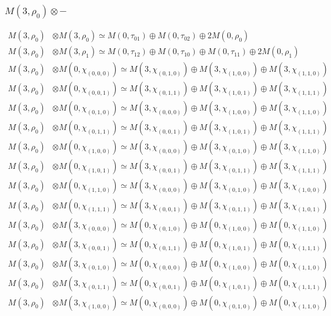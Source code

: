 \subsubsection{$ M(3,\rho_{0})\otimes -$}
\begin{align*}
M(3,\rho_{0}) &\otimes M(3,\rho_{0}) \simeq M(0,\tau_{01}) \oplus M(0,\tau_{02}) \oplus 2 M(0,\rho_{0}) \\
M(3,\rho_{0}) &\otimes M(3,\rho_{1}) \simeq M(0,\tau_{12}) \oplus M(0,\tau_{10}) \oplus M(0,\tau_{11}) \oplus 2 M(0,\rho_{1}) \\
M(3,\rho_{0}) &\otimes M(0,\chi_{(0,0,0)}) \simeq M(3,\chi_{(0,1,0)}) \oplus M(3,\chi_{(1,0,0)}) \oplus M(3,\chi_{(1,1,0)}) \\
M(3,\rho_{0}) &\otimes M(0,\chi_{(0,0,1)}) \simeq M(3,\chi_{(0,1,1)}) \oplus M(3,\chi_{(1,0,1)}) \oplus M(3,\chi_{(1,1,1)}) \\
M(3,\rho_{0}) &\otimes M(0,\chi_{(0,1,0)}) \simeq M(3,\chi_{(0,0,0)}) \oplus M(3,\chi_{(1,0,0)}) \oplus M(3,\chi_{(1,1,0)}) \\
M(3,\rho_{0}) &\otimes M(0,\chi_{(0,1,1)}) \simeq M(3,\chi_{(0,0,1)}) \oplus M(3,\chi_{(1,0,1)}) \oplus M(3,\chi_{(1,1,1)}) \\
M(3,\rho_{0}) &\otimes M(0,\chi_{(1,0,0)}) \simeq M(3,\chi_{(0,0,0)}) \oplus M(3,\chi_{(0,1,0)}) \oplus M(3,\chi_{(1,1,0)}) \\
M(3,\rho_{0}) &\otimes M(0,\chi_{(1,0,1)}) \simeq M(3,\chi_{(0,0,1)}) \oplus M(3,\chi_{(0,1,1)}) \oplus M(3,\chi_{(1,1,1)}) \\
M(3,\rho_{0}) &\otimes M(0,\chi_{(1,1,0)}) \simeq M(3,\chi_{(0,0,0)}) \oplus M(3,\chi_{(0,1,0)}) \oplus M(3,\chi_{(1,0,0)}) \\
M(3,\rho_{0}) &\otimes M(0,\chi_{(1,1,1)}) \simeq M(3,\chi_{(0,0,1)}) \oplus M(3,\chi_{(0,1,1)}) \oplus M(3,\chi_{(1,0,1)}) \\
M(3,\rho_{0}) &\otimes M(3,\chi_{(0,0,0)}) \simeq M(0,\chi_{(0,1,0)}) \oplus M(0,\chi_{(1,0,0)}) \oplus M(0,\chi_{(1,1,0)}) \\
M(3,\rho_{0}) &\otimes M(3,\chi_{(0,0,1)}) \simeq M(0,\chi_{(0,1,1)}) \oplus M(0,\chi_{(1,0,1)}) \oplus M(0,\chi_{(1,1,1)}) \\
M(3,\rho_{0}) &\otimes M(3,\chi_{(0,1,0)}) \simeq M(0,\chi_{(0,0,0)}) \oplus M(0,\chi_{(1,0,0)}) \oplus M(0,\chi_{(1,1,0)}) \\
M(3,\rho_{0}) &\otimes M(3,\chi_{(0,1,1)}) \simeq M(0,\chi_{(0,0,1)}) \oplus M(0,\chi_{(1,0,1)}) \oplus M(0,\chi_{(1,1,1)}) \\
M(3,\rho_{0}) &\otimes M(3,\chi_{(1,0,0)}) \simeq M(0,\chi_{(0,0,0)}) \oplus M(0,\chi_{(0,1,0)}) \oplus M(0,\chi_{(1,1,0)}) \\

\end{align*}
